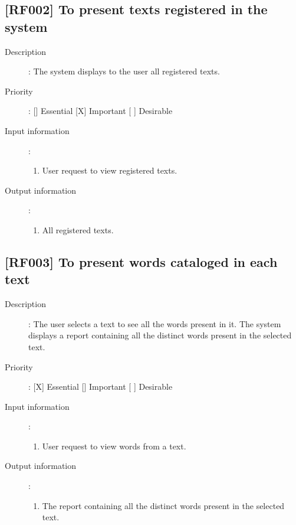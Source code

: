 \documentclass[11pt, twoside, a4paper]{book}
\begin{document}
			\subsection{[RF002] To present texts registered in the system}
				
				\begin{description}
				
					\item[Description]: The system displays to the user all registered texts.	
					\item[Priority]: [] Essential [X] Important [ ] Desirable
					\item[Input information]:
						\begin{enumerate}

							\item User request to view registered texts.
							
						\end{enumerate}
					\item[Output information]:
						\begin{enumerate}
						
							\item All registered texts.
														
						\end{enumerate}
	
				\end{description}

			\subsection{[RF003] To present words cataloged in each text}
				
				\begin{description}
				
					\item[Description]: The user selects a text to see all the words present in it. The system displays a report containing all the distinct words present in the selected text.
					\item[Priority]: [X] Essential [] Important [ ] Desirable
					\item[Input information]:
						\begin{enumerate}

							\item User request to view words from a text.
							
						\end{enumerate}
					\item[Output information]:
						\begin{enumerate}
						
							\item The report containing all the distinct words present in the selected text.

						\end{enumerate}
	
				\end{description}
			
\end{document}

